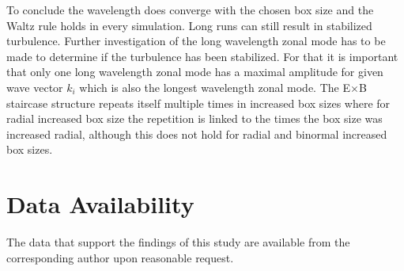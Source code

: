 \documentclass[aip, amsmath, amssymb, reprint, twocolumn]{revtex4-1}
\newcommand{\includegraphicsTwoCol}[4]{
	\onecolumngrid
	\begin{center}
		\captionsetup{type=figure}
    	\texttt{[image: \#1]}
		\captionof{figure}{#2}
    	\label{#3}
	\end{center}
	\twocolumngrid
	\increasecounter{fig}{2}
}
\begin{document}



To conclude the wavelength does converge with the chosen box size and the Waltz rule holds in every simulation. Long runs can still result in stabilized turbulence. Further investigation of the long wavelength zonal mode has to be made to determine if the turbulence has been stabilized. For that it is important that only one long wavelength zonal mode has a maximal amplitude for given wave vector $k_i$ which is also the longest wavelength zonal mode. The E$\times$B staircase structure repeats itself multiple times in increased box sizes where for radial increased box size the repetition is linked to the times the box size was increased radial, although this does not hold for radial and binormal increased box sizes. 
\bigskip


\section*{Data Availability}
The data that support the findings of this study are available from the corresponding author upon reasonable request. 
\bigskip
\bigskip
\bigskip
\bigskip
\bigskip
\bigskip




\nocite{}
\end{document}
